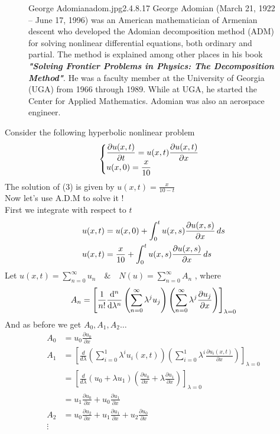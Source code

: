 \documentclass[]{article}
\begin{document}
\begin{figure}[b]
    \begin{enrichment}{George Adomian}{adom.jpg}{2.4}{.8}{.17}
        George Adomian (March 21, 1922 – June 17, 1996) 
        was an American mathematician of Armenian descent 
        who developed the Adomian decomposition method (ADM) 
        for solving nonlinear differential equations, 
        both ordinary and partial. 
        The method is explained among other places
        in his book \textit{\textbf{"Solving Frontier Problems in Physics: 
        The Decomposition Method"}}.
        He was a faculty member at the University of Georgia 
        (UGA) from 1966 through 1989. While at UGA, 
        he started the Center for Applied Mathematics. 
        Adomian was also an aerospace engineer.
    \end{enrichment}    
\end{figure}
\newpage
Consider the following hyperbolic nonlinear problem\\
\begin{equation}
    \begin{cases}
         \displaystyle \pdv{u(x,t)}{t} =  u(x,t)\pdv{u(x,t)}{ x}
         \\
         \displaystyle u(x,0) = \frac{x}{10}
     \end{cases}
 \end{equation}
 The solution of (3) is given by $\displaystyle u(x,t)=\frac{x}{10-t}$\\
 Now let's use A.D.M to solve it !\\
 First we integrate with respect to $t$
 \begin{align*}
    u(x,t) &= u(x,0) + \int_{0}^{t} u(x,s) \pdv{u(x,s)}{x} \, ds
    \\
    u(x,t) &= \frac{x}{10} + \int_{0}^{t} u(x,s) \pdv{u(x,s)}{x} \, ds
 \end{align*}
 Let $\displaystyle u(x,t) = \sum_{n=0}^{\infty} u_n \quad \& \quad N(u) = \sum_{n=0}^{\infty} A_n$ , where
 \begin{equation*}
    A_n = \left[ \frac{1}{n!} \dv[n]{}{\lambda}  \left( \sum_{n=0}^{\infty} \lambda^j u_j \right) \left( \sum_{n=0}^{\infty}\lambda^j \pdv{u_j}{x} \right) \right]_{\lambda = 0}
 \end{equation*}
 And as before we get $A_0,A_1,A_2\dots$
\begin{align*}
    A_0 &= u_0\frac{\partial u_0}{\partial x}
    \\
    A_1 &= \left[\frac{d}{d \lambda} \left(\sum_{i=0}^{1}  \lambda^i u_i(x,t)\right)\left(\sum_{i=0}^{1}  \lambda^i \frac{\partial u_i(x,t)}{\partial x}\right)\right]_{\lambda = 0}
    \\
    &= \left[\frac{d}{d \lambda} \left(u_0 + \lambda u_1 \right)\left(\frac{\partial u_0}{\partial x} + \lambda\frac{\partial u_1}{\partial x}\right)\right]_{\lambda = 0}
    \\
    &= u_1 \frac{\partial u_0}{\partial x} + u_0 \frac{\partial u_1}{\partial x}
    \\
    A_2 &= u_0 \frac{\partial u_2}{\partial x} + u_1 \frac{\partial u_1}{\partial x} + u_2 \frac{\partial u_0}{\partial x}
    \\
    \vdots
\end{align*}
\end{document}
